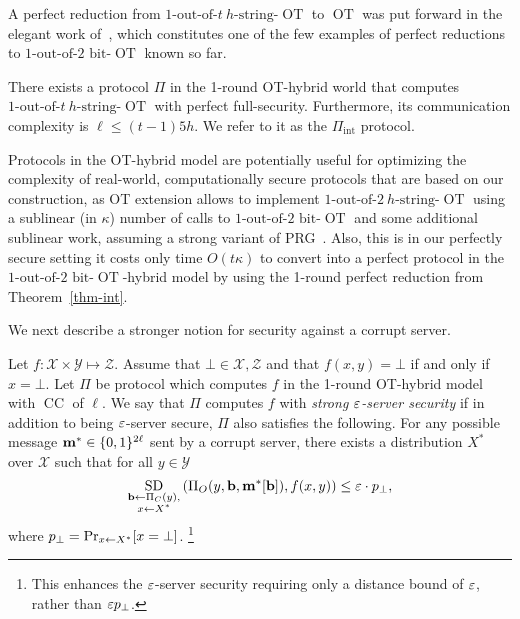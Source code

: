 \documentclass{llncs}
\newcommand{\bnote}[1]{\authnote{Bar}{#1}}
\newcommand{\OT}{\operatorname{OT}}
\newcommand{\bOT}[2]{#1\text{-out-of-}#2\text{ bit-}\OT}
\newcommand{\sOT}[3]{#1\text{-out-of-}#2~#3\text{-string-}\OT}
\newcommand{\X}{\mathcal{X}}
\newcommand{\Y}{\mathcal{Y}}
\renewcommand{\Z}{\mathcal{Z}}
\newcommand{\INT}{\Pi_{\operatorname{int}}}
\newcommand{\m}{\myvec{m}}
\newcommand{\CC}{\operatorname{CC}}
\renewcommand{\SD}{\operatorname*{SD}}
\begin{document}
A perfect reduction from $\sOT{1}{t}{h}$ to $\OT$ was put forward in the elegant work of~\citet{BCS96}, which constitutes one of the few examples of perfect reductions to $\bOT{1}{2}$ known so far.

\begin{theorem}\label{thm-int}%
	There exists a protocol $\Pi$ in the 1-round OT-hybrid world that computes $\sOT{1}{t}{h}$ with perfect full-security. Furthermore, its communication complexity is $\ell\leq (t-1)5h$. We refer to it as the $\INT$ protocol.
\end{theorem}

Protocols in the OT-hybrid model are potentially useful for optimizing the complexity of real-world, computationally secure protocols that are based on our construction, as OT extension allows to implement $\sOT{1}{2}{h}$ using a sublinear (in $\kappa$) number of calls to $\bOT{1}{2}$ and some additional sublinear work, assuming a strong variant of PRG~\cite{IKOS08}. Also, this is \wlg in our perfectly secure setting it costs only time $O(t\kappa)$ \bnote{What is $t$?} to convert into a perfect protocol in the $\bOT{1}{2}$-hybrid model by using the 1-round perfect reduction from Theorem~\ref{thm-int}.

We next describe a stronger notion for security against a corrupt server.
\begin{definition}\label{def-enh-cl}
Let $f:\X\times\Y\mapsto\Z$. Assume that $\bot\in\X,\Z$ and that $f(x,y)=\bot$ if and only if $x=\bot$. Let $\Pi$ be protocol which computes $f$ in the 1-round OT-hybrid model with $\CC$ of $\ell$. We say that $\Pi$ computes $f$ with \emph{strong $\varepsilon$-server security} if in addition to being $\varepsilon$-server secure, $\Pi$ also satisfies the following. For any possible message $\m^*\in\zo^{2\ell}$ sent by a corrupt server, there exists a distribution $X^*$ over $\X$ such that for all $y\in\Y$
$$
\SD_{\substack{\myvec{b}\from\Pi_C(y),\\x\from X^*}}
\of{\Pi_O(y,\myvec{b},\myvec{m}^*[\myvec{b}]), f(x,y)}\leq \eps\cdot p_{\bot},
$$
where $p_\bot=\Pr_{x\leftarrow X^*}[x=\bot]$. \footnote{This enhances the $\varepsilon$-server security requiring only a distance bound 
of $\varepsilon$, rather than $\varepsilon p_\bot$.} 
\end{definition}
\end{document}
